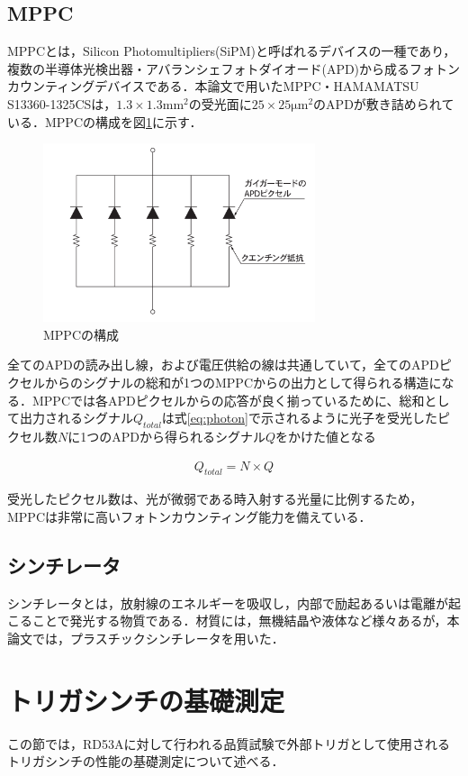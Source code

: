 \subsection*{MPPC}
MPPCとは，Silicon Photomultipliers(SiPM)と呼ばれるデバイスの一種であり，複数の半導体光検出器・アバランシェフォトダイオード(APD)から成るフォトンカウンティングデバイスである．本論文で用いたMPPC・HAMAMATSU S13360-1325CSは，$1.3 \times 1.3 \mathrm{mm^2}$の受光面に$25 \times 25 \mathrm{\mu m^2}$のAPDが敷き詰められている．MPPCの構成を図\ref{fig:APD}に示す．

\begin{figure}[h]
  \centering
  \includegraphics[width=8cm]{./figure/apd.png}
  \caption{MPPCの構成}
  \label{fig:APD}
\end{figure}

全てのAPDの読み出し線，および電圧供給の線は共通していて，全てのAPDピクセルからのシグナルの総和が1つのMPPCからの出力として得られる構造になる．MPPCでは各APDピクセルからの応答が良く揃っているために、総和として出力されるシグナル$Q_{total}$は式\ref{eq:photon}で示されるように光子を受光したピクセル数$N$に1つのAPDから得られるシグナル$Q$をかけた値となる

\begin{eqnarray}
  Q_{total} = N \times Q
\end{eqnarray}

受光したピクセル数は、光が微弱である時入射する光量に比例するため， MPPCは非常に高いフォトンカウンティング能力を備えている．

\subsection*{シンチレータ}
シンチレータとは，放射線のエネルギーを吸収し，内部で励起あるいは電離が起こることで発光する物質である．材質には，無機結晶や液体など様々あるが，本論文では，プラスチックシンチレータを用いた．

\section{トリガシンチの基礎測定}
この節では，RD53Aに対して行われる品質試験で外部トリガとして使用されるトリガシンチの性能の基礎測定について述べる．

